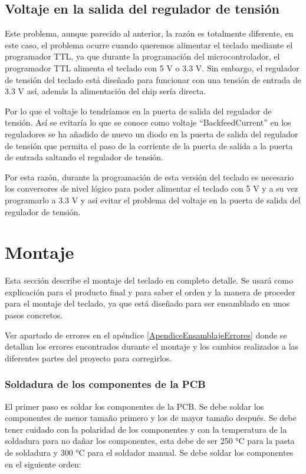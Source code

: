 \subsection{Voltaje en la salida del regulador de tensión} \label{VoltajeRegulador}
Este problema, aunque parecido al anterior, la razón es totalmente diferente, en este caso, el problema ocurre cuando queremos alimentar el teclado mediante el programador \gls{TTL}, ya que durante la programación del microcontrolador, el programador \gls{TTL} alimenta el teclado con 5 V o 3.3 V. Sin embargo, el regulador de tensión del teclado está diseñado para funcionar con una tensión de entrada de 3.3 V así, además la alimentación del chip sería directa.

Por lo que el voltaje lo tendríamos en la puerta de salida del regulador de tensión. Así se evitaría lo que se conoce como voltaje ``\gls{BackfeedCurrent}'' en los reguladores se ha añadido de nuevo un diodo en la puerta de salida del regulador de tensión que permita el paso de la corriente de la puerta de salida a la puerta de entrada saltando el regulador de tensión.

Por esta razón, durante la programación de esta versión del teclado es necesario los conversores de nivel lógico para poder alimentar el teclado con 5 V y a su vez programarlo a 3.3 V y así evitar el problema del voltaje en la puerta de salida del regulador de tensión.

\newpage
\section{Montaje} \label{MontajeTeclado}
Esta sección describe el montaje del teclado en completo detalle. Se usará como explicación para el producto final y para saber el orden y la manera de proceder para el montaje del teclado, ya que está diseñado para ser ensamblado en unos pasos concretos.

\begin{tcolorbox}[colback=red!11!white, colframe=red!50!white, title=Errores]
    Ver apartado de errores en el apéndice \ref{ApendiceEnsamblajeErrores} donde se detallan los errores encontrados durante el montaje y los cambios realizados a las diferentes partes del proyecto para corregirlos.
\end{tcolorbox}

\subsubsection{Soldadura de los componentes de la \gls{PCB}}
El primer paso es soldar los componentes de la \gls{PCB}. Se debe soldar los componentes de menor tamaño primero y los de mayor tamaño después. Se debe tener cuidado con la polaridad de los componentes y con la temperatura de la soldadura para no dañar los componentes, esta debe de ser 250 °C para la pasta de soldadura y 300 °C para el soldador manual. Se debe soldar los componentes en el siguiente orden:

